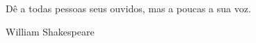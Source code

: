 

\begin{flushright}
\begin{minipage}[r]{10cm}
\vspace{15cm}
Dê a todas pessoas seus ouvidos, mas a poucas a sua voz.
\begin{flushright}
	William Shakespeare
\end{flushright}
\end{minipage}
\end{flushright}


